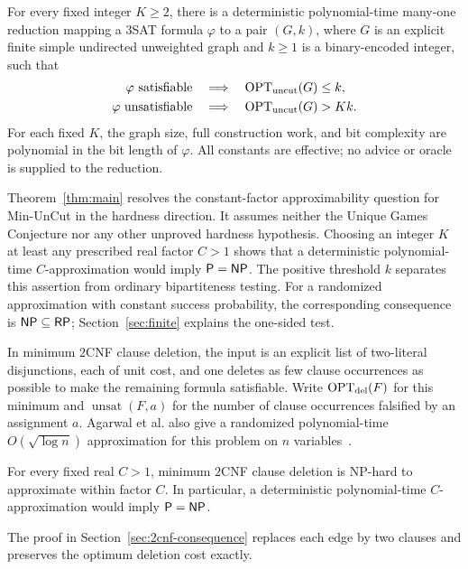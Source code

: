 \begin{theorem}\label{thm:main}
For every fixed integer $K\ge2$, there is a deterministic polynomial-time
many-one reduction mapping a $3$SAT formula $\varphi$ to a pair $(G,k)$, where
$G$ is an explicit finite simple undirected unweighted graph and $k\ge1$ is
a binary-encoded integer, such that
\[
 \begin{aligned}
 \varphi\text{ satisfiable}&\quad\Longrightarrow\quad
       \operatorname{OPT}_{\rm uncut}(G)\le k,\\
 \varphi\text{ unsatisfiable}&\quad\Longrightarrow\quad
       \operatorname{OPT}_{\rm uncut}(G)>Kk.
 \end{aligned}
\]
For each fixed $K$, the graph size, full construction work, and bit complexity
are polynomial in the bit length of $\varphi$. All constants are effective;
no advice or oracle is supplied to the reduction.
\end{theorem}

Theorem~\ref{thm:main} resolves the constant-factor approximability question
for Min-UnCut in the hardness direction. It assumes neither the Unique Games
Conjecture nor any other unproved hardness hypothesis. Choosing an integer
$K$ at least any prescribed real factor $C>1$ shows that a deterministic
polynomial-time $C$-approximation would imply $\mathsf P=\mathsf{NP}$.
The positive threshold $k$ separates this assertion from ordinary
bipartiteness testing. For a randomized approximation with constant success
probability, the corresponding consequence is $\mathsf{NP}\subseteq\mathsf{RP}$;
Section~\ref{sec:finite} explains the one-sided test.

In minimum $2$CNF clause deletion, the input is an explicit list of
two-literal disjunctions, each of unit cost, and one deletes as few clause
occurrences as possible to make the remaining formula satisfiable. Write
$\operatorname{OPT}_{\rm del}(F)$ for this minimum and $\operatorname{unsat}(F,a)$ for the
number of clause occurrences falsified by an assignment $a$. Agarwal et al.
also give a randomized polynomial-time $O(\sqrt{\log n})$ approximation
for this problem on $n$ variables~\cite[Theorem~3.1]{ACMM2005}.

\begin{corollary}\label{cor:min-2cnf-deletion}
For every fixed real $C>1$, minimum $2$CNF clause deletion is NP-hard to
approximate within factor $C$. In particular, a deterministic polynomial-time
$C$-approximation would imply $\mathsf P=\mathsf{NP}$.
\end{corollary}

The proof in Section~\ref{sec:2cnf-consequence} replaces each edge by two
clauses and preserves the optimum deletion cost exactly.

